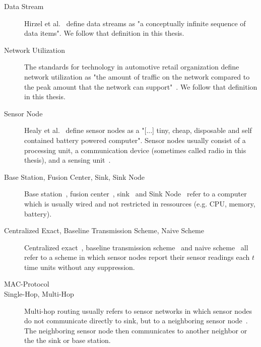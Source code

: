 \begin{description}

    \item[Data Stream]
        Hirzel et al.~\cite{hirzel2014catalog} define data streams as "a
        conceptually infinite sequence of data items". We follow that
        definition in this thesis.
    \item[Network Utilization]
        The standards for technology in automotive retail organization define
        network utilization as "the amount of traffic on the network compared
        to the peak amount that the network can support"~\cite{networkutil}. We
        follow that definition in this thesis.

    \item[Sensor Node]
        Healy et al.~\cite{healy2008wireless} define sensor nodes as a "[...]
        tiny, cheap, disposable and self contained battery powered computer".
        Sensor nodes usually consist of a processing unit, a communication
        device (sometimes called radio in this thesis), and a sensing
        unit~\cite{akyildiz2002wireless}.

    \item[Base Station, Fusion Center, Sink, Sink Node]
        Base station~\cite{padhy2006utility}, fusion
        center~\cite{willett2004backcasting}, sink~\cite{alippi2009energy} and
        Sink Node~\cite{chen2013sink} refer to a computer which is usually
        wired and not restricted in ressources (e.g. CPU, memory, battery).

    \item[Centralized Exact, Baseline Transmission Scheme, Naive Scheme]
        Centralized exact~\cite{gedik2007asap}, baseline transmission
        scheme~\cite{luo2009compressive} and naive
        scheme~\cite{cheng2010efficient} all refer to a scheme in which sensor
        nodes report their sensor readings each $ t $ time units without any
        suppression. 

    \item[\ac{MAC}-Protocol]
        

    \item[Single-Hop, Multi-Hop]
        Multi-hop routing usually refers to sensor networks in which sensor
        nodes do not communicate directly to sink, but to a neighboring sensor
        node~\cite{yaacoub2012multihop}. The neighboring sensor node then
        communicates to another neighbor or the the sink or base station.


\end{description}
